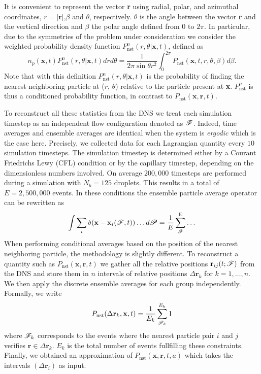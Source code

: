 It is convenient to represent the vector \textbf{r} using radial, polar, and azimuthal coordinates,  $r = |\textbf{r}|$,$\beta$ and $\theta$, respectively. $\theta$ is the angle between the vector \textbf{r} and the vertical direction and $\beta$ the polar angle defined from $0$ to $2\pi$. In particular, due to the symmetries of the problem under consideration we consider the weighted probability density function $P_\text{nst}^n(r,\theta|\textbf{x},t)$, defined as
\begin{equation}
    n_p(\textbf{x},t) P_\text{nst}^n(r,\theta|\textbf{x},t)dr d\theta 
    =\frac{1}{2\pi \sin\theta r^2 }
    \int_0^{2\pi}
    P_\text{nst}(\textbf{x},t,r,\theta,\beta) 
    d\beta.
    \label{eq:Ptheta_r}
\end{equation}
Note that with this definition $P_\text{nst}^n(r,\theta|\textbf{x},t)$ is the probability of finding the nearest neighboring particle at ($r$, $\theta$) relative to the particle present at \textbf{x}. 
$P_\text{nst}^n$ is thus a conditioned probability function, in contrast to $P_\text{nst}(\textbf{x},\textbf{r},t)$. 

To reconstruct all these statistics from the DNS we treat each simulation timestep as an independent flow configuration denoted as $\mathscr{F}$. 
Indeed, time averages and ensemble averages are identical when the system is \textit{ergodic} \citep{hansen2013theory} which is the case here.  
Precisely, we collected data for each Lagrangian quantity every $10$ simulation timesteps. 
The simulation timestep is determined either by a Courant Friedrichs Lewy (CFL) condition or by the capillary timestep, depending on the dimensionless numbers involved.
On average $200,000$ timesteps are performed during a simulation with $N_b = 125$ droplets. 
This results in a total of $E = 2,500,000$ events. 
In these conditions the ensemble particle average operator can be rewritten as
\begin{equation}
    \int \sum_i \delta(\textbf{x}-\textbf{x}_i(\mathscr{F},t)) \ldots d\mathscr{P}
    = \frac{1}{E}\sum_{\mathscr{F}}^\text{E} \ldots 
    \label{eq:discrete_ensemble_average}
\end{equation}  
When performing conditional averages based on the position of the nearest neighboring particle, the methodology is slightly different. 
To reconstruct a quantity such as $P_\text{nst}(\textbf{x},\textbf{r},t)$ we gather all the relative positions $\textbf{r}_{ij}(t;\mathscr{F})$ from the DNS and store them in $n$ intervals of relative positions $\Delta \textbf{r}_k$ for $k = 1,\ldots, n$.
We then apply the discrete ensemble averages for each group independently.
Formally, we write
\begin{equation}
    P_\text{nst}(\Delta\textbf{r}_k,\textbf{x},t)
    = \frac{1}{E_k} 
    \sum^{E_k}_{\mathscr{F}_k} 
    1
    \label{eq:vec_cond}
\end{equation}
where $\mathscr{F}_k$ corresponds to the events where the nearest particle pair $i$ and $j$ verifies $\textbf{r} \in \Delta \textbf{r}_k$.
$E_k$ is the total number of events fullfilling these constraints. 
Finally, we obtained an approximation of $P_\text{nst}(\textbf{x},\textbf{r},t,a)$ which takes the intervals $(\Delta\textbf{r}_i)$ as input.

